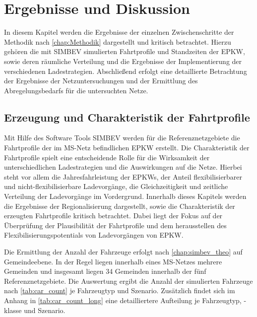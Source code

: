 \section{Ergebnisse und Diskussion}\label{chap:results}

In diesem Kapitel werden die Ergebnisse der einzelnen Zwischenschritte der Methodik nach \autoref{chap:Methodik} dargestellt und kritisch betrachtet.
Hierzu gehören die mit \gls{SIMBEV} simulierten Fahrtprofile und Standzeiten der \gls{EPKW}, sowie deren räumliche Verteilung und die Ergebnisse der Implementierung der verschiedenen Ladestrategien.
Abschließend erfolgt eine detaillierte Betrachtung der Ergebnisse der Netzuntersuchungen und der Ermittlung des Abregelungsbedarfs für die untersuchten Netze.


\subsection{Erzeugung und Charakteristik der Fahrtprofile}

Mit Hilfe des Software Tools \gls{SIMBEV} werden für die Referenznetzgebiete die Fahrtprofile der im \gls{MS}-Netz befindlichen \gls{EPKW} erstellt.
Die Charakteristik der Fahrtprofile spielt eine entscheidende Rolle für die Wirksamkeit der unterschiedlichen Ladestrategien und die Auswirkungen auf die Netze.
Hierbei steht vor allem die Jahresfahrleistung der \glspl{EPKW}, der Anteil flexibilisierbarer und nicht-flexibilisierbare Ladevorgänge, die Gleichzeitigkeit und zeitliche Verteilung der Ladevorgänge im Vordergrund.
Innerhalb dieses Kapitels werden die Ergebnisse der Regionalisierung dargestellt, sowie die Charakteristik der erzeugten Fahrtprofile kritisch betrachtet.
Dabei liegt der Fokus auf der Überprüfung der Plausibilität der Fahrtprofile und dem herausstellen des Flexibilisierungspotentials von Ladevorgängen von \gls{EPKW}.\medskip

Die Ermittlung der Anzahl der Fahrzeuge erfolgt nach \autoref{chap:simbev_theo} auf Gemeindeebene.
In der Regel liegen innerhalb eines \gls{MS}-Netzes mehrere Gemeinden und insgesamt liegen \num{34} Gemeinden innerhalb der fünf Referenznetzgebiete.
Die Auswertung ergibt die Anzahl der simulierten Fahrzeuge nach \autoref{tab:car_count} je Fahrzeugtyp und Szenario.
Zusätzlich findet sich im Anhang in \autoref{tab:car_count_long} eine detailliertere Aufteilung je Fahrzeugtyp, -klasse und Szenario.



